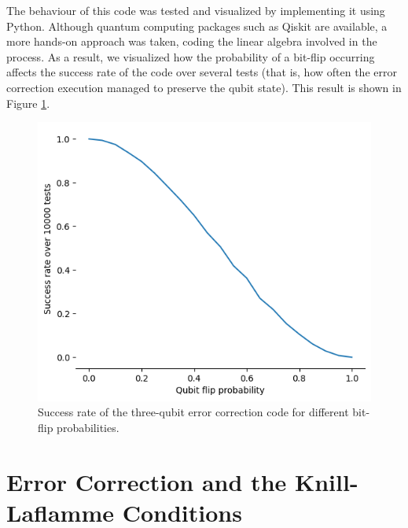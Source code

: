 The behaviour of this code was tested and visualized by implementing it using Python. Although quantum computing packages such as Qiskit are available, a more hands-on approach was taken, coding the linear algebra involved in the process. As a result, we visualized how the probability of a bit-flip occurring affects the success rate of the code over several tests (that is, how often the error correction execution managed to preserve the qubit state). This result is shown in Figure \ref{fig:three-qbit-code-success}.
\begin{figure}
    \centering
    \includegraphics[scale=0.5]{Success_rate.png}
    \caption{Success rate of the three-qubit error correction code for different bit-flip probabilities.}
    \label{fig:three-qbit-code-success}
\end{figure}

\section{Error Correction and the Knill-Laflamme Conditions}

